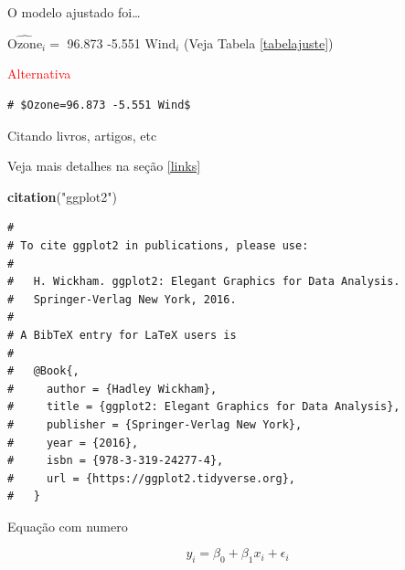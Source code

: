 \documentclass[10pt,ignorenonframetext,]{beamer}
\newenvironment{Shaded}{\begin{snugshade}}{\end{snugshade}}
\newcommand{\DecValTok}[1]{\textcolor[rgb]{0.27,0.67,0.26}{#1}}
\newcommand{\KeywordTok}[1]{\textcolor[rgb]{0.26,0.66,0.93}{\textbf{#1}}}
\newcommand{\NormalTok}[1]{\textcolor[rgb]{0.74,0.68,0.62}{#1}}
\newcommand{\StringTok}[1]{\textcolor[rgb]{0.02,0.61,0.04}{#1}}
\begin{document}
\begin{frame}[fragile]{O modelo ajustado foi\ldots{}}
\protect\hypertarget{o-modelo-ajustado-foi}{}

\(\widehat{\text{Ozone}}_i=\) 96.873 -5.551 \(\text{Wind}_i\) (Veja
Tabela \ref{tabelajuste})

\textcolor{red}{Alternativa}

\begin{Shaded}
\end{Shaded}

\begin{verbatim}
# $Ozone=96.873 -5.551 Wind$
\end{verbatim}

\end{frame}

\begin{frame}[fragile]{Citando livros, artigos, etc}
\protect\hypertarget{citando-livros-artigos-etc}{}

Veja mais detalhes na seção \ref{links}

\tiny

\begin{Shaded}
\begin{Highlighting}[]
\KeywordTok{citation}\NormalTok{(}\StringTok{"ggplot2"}\NormalTok{)}
\end{Highlighting}
\end{Shaded}

\begin{verbatim}
# 
# To cite ggplot2 in publications, please use:
# 
#   H. Wickham. ggplot2: Elegant Graphics for Data Analysis.
#   Springer-Verlag New York, 2016.
# 
# A BibTeX entry for LaTeX users is
# 
#   @Book{,
#     author = {Hadley Wickham},
#     title = {ggplot2: Elegant Graphics for Data Analysis},
#     publisher = {Springer-Verlag New York},
#     year = {2016},
#     isbn = {978-3-319-24277-4},
#     url = {https://ggplot2.tidyverse.org},
#   }
\end{verbatim}

\end{frame}

\begin{frame}{Equação com numero}
\protect\hypertarget{equauxe7uxe3o-com-numero}{}

\begin{equation}
y_i=\beta_0 + \beta_1 x_i + \epsilon_i \label{Eq0}
\end{equation}

\end{frame}
\end{document}
